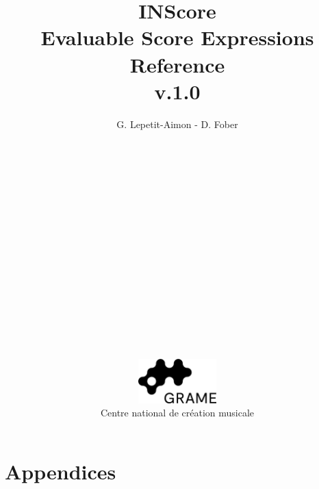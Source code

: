 \documentclass[a4paper,twoside]{article}
\newcommand{\toplevel}[1]	{\section{#1}}
\begin{document}
\title{\vspace*{7cm}INScore \\ Evaluable Score Expressions Reference \\v.1.0}
\author{G. Lepetit-Aimon - D. Fober\\ 
\\
\\
\\
\\
\\
\\
\\
\\
\\
\\
\\
\\
\\
\\
\\
\\
\\
\includegraphics[width=30mm]{../imgs/Logo_Grame}\\
Centre national de création musicale\\
}
\date{}

\maketitle
\thispagestyle{empty}
 
\cleardoublepage
\tableofcontents
\newpage
\setcounter{page}{1}

\pagestyle{mystyle}




\newpage
\toplevel{Appendices}
\label{appendices}

\end{document}
